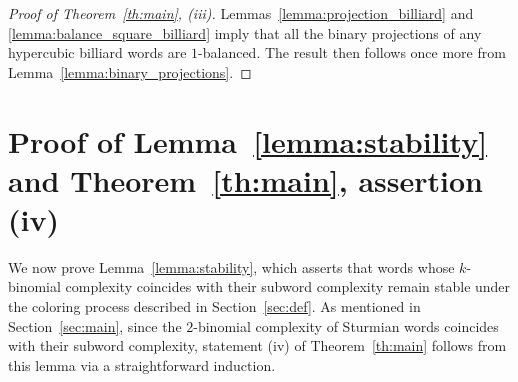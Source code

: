 \documentclass{template_arxiv}
\theoremstyle{definition}
\begin{document}
\begin{proof}[Proof of Theorem~\ref{th:main}, (iii)]
Lemmas~\ref{lemma:projection_billiard} and \ref{lemma:balance_square_billiard} imply that all the binary projections of any hypercubic billiard words are $1$-balanced. The result then follows once more from Lemma~\ref{lemma:binary_projections}.
\end{proof}

\section{Proof of Lemma~\ref{lemma:stability} and Theorem~\ref{th:main}, assertion (iv)}\label{sec:stability}

We now prove Lemma~\ref{lemma:stability}, which asserts that words whose $k$-binomial complexity coincides with their subword complexity remain stable under the coloring process described in Section~\ref{sec:def}. As mentioned in Section~\ref{sec:main}, since the $2$-binomial complexity of Sturmian words coincides with their subword complexity, statement (iv) of Theorem~\ref{th:main} follows from this lemma via a straightforward induction.
\end{document}
